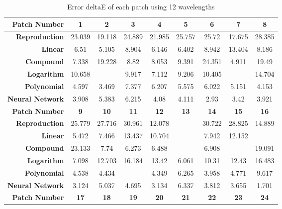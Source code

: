 \begin{table}[H]
  \caption{\label{tab:Euclidean distance of each patch for 12 images}Error deltaE of each patch using 12 wavelengths}
  \begin{center}
    \begin{tabularx}{\textwidth}{r c c c c c c c c}
    \toprule
        \textbf{Patch Number} & \textbf{1} & \textbf{2} & \textbf{3} & \textbf{4} & \textbf{5} & \textbf{6} & \textbf{7} & \textbf{8}\\ \midrule 
        \textbf{Reproduction} &23.039 &19.118 &24.889 &21.985 &25.757 &25.72 &17.675 &28.385\\ 
        \textbf{Linear} &6.51 &5.105 &8.904 &6.146 &6.402 &8.942 &13.404 &8.186\\ 
        \textbf{Compound} &7.338 &19.228 &8.82 &8.053 &9.391 &24.351 &4.911 &19.49\\ 
        \textbf{Logarithm} &10.658 &\cellcolor{colorgreen}{3.084} &9.917 &7.112 &9.206 &10.405 &\cellcolor{colorred}{18.933} &14.704\\ 
        \textbf{Polynomial} &4.597 &3.469 &7.377 &6.207 &5.575 &6.022 &5.151 &4.153\\ 
        \textbf{Neural Network} &3.908 &5.383 &6.215 &4.08 &4.111 &2.93 &3.42 &3.921\\ \midrule 
        \textbf{Patch Number} & \textbf{9} & \textbf{10} & \textbf{11} & \textbf{12} & \textbf{13} & \textbf{14} & \textbf{15} & \textbf{16}\\ \midrule 
        \textbf{Reproduction} &25.779 &27.716 &30.961 &12.078 &\cellcolor{colorred}{31.537} &30.722 &28.825 &14.889\\ 
        \textbf{Linear} &5.472 &7.466 &13.437 &10.704 &\cellcolor{colorgreen}{4.744} &7.942 &12.152 &\cellcolor{colorred}{15.425}\\ 
        \textbf{Compound} &23.133 &7.74 &6.273 &6.488 &\cellcolor{colorgreen}{4.607} &6.908 &\cellcolor{colorred}{29.981} &19.091\\ 
        \textbf{Logarithm} &7.098 &12.703 &16.184 &13.42 &6.061 &10.31 &12.43 &16.483\\ 
        \textbf{Polynomial} &4.538 &4.434 &\cellcolor{colorred}{12.564} &4.349 &6.265 &3.958 &4.771 &9.617\\ 
        \textbf{Neural Network} &3.124 &5.037 &4.695 &3.134 &6.337 &3.812 &3.655 &1.701\\ \midrule 
        \textbf{Patch Number} & \textbf{17} & \textbf{18} & \textbf{19} & \textbf{20} & \textbf{21} & \textbf{22} & \textbf{23} & \textbf{24}\\ \midrule 

\end{tabularx}
\end{center}
\end{table}
